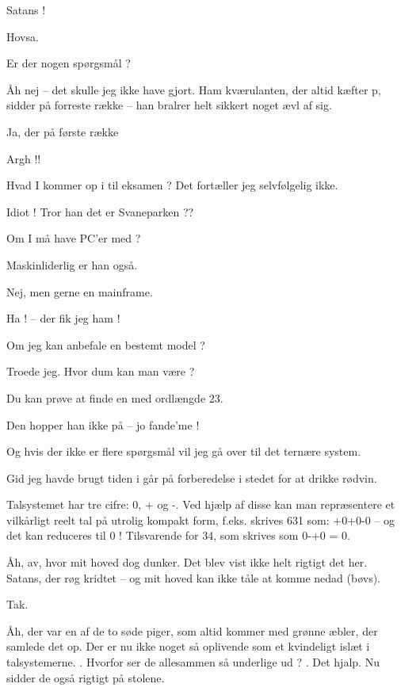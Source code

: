 \documentclass[a4paper,11pt]{article}
\begin{document}
\begin{sketch}
 Satans !

 Hovsa. 

 Er der nogen spørgsmål ?

 Åh nej -- det skulle jeg ikke have gjort. Ham kværulanten, der altid
kæfter p, sidder på forreste række -- han bralrer helt sikkert noget ævl af sig.

 Ja, der på første række

 Argh !!

 Hvad I kommer op i til eksamen ?  Det fortæller jeg selvfølgelig ikke.

 Idiot ! Tror han det er Svaneparken ??

 Om I må have PC'er med ?

 Maskinliderlig er han også.

 Nej, men gerne en mainframe.

 Ha ! -- der fik jeg ham !

 Om jeg kan anbefale en bestemt model ?

 Troede jeg. Hvor dum kan man være ?

 Du kan prøve at finde en med ordlængde 23.

 Den hopper han ikke på -- jo fande'me !

 Og hvis der ikke er flere spørgsmål vil jeg gå over til det ternære
system. 

 Gid jeg havde brugt tiden i går på forberedelse i stedet for at drikke
rødvin.

 Talsystemet har tre cifre: 0, + og -. Ved hjælp af disse kan man
repræsentere et vilkårligt reelt tal på utrolig kompakt form, f.eks. skrives 631
som: +0+0-0 -- og det kan reduceres til 0 ! Tilsvarende for 34, som skrives som
0-+0 = 0.

 Åh, av, hvor mit hoved dog dunker. Det blev vist ikke helt rigtigt det
her. Satans, der røg kridtet -- og mit hoved kan ikke tåle at komme nedad
(bøvs).

 Tak.

 Åh, der var en af de to søde piger, som altid kommer med grønne æbler,
der samlede det op. Der er nu ikke noget så oplivende som et kvindeligt islæt i
talsystemerne. . Hvorfor ser de allesammen så underlige ud ?
. Det hjalp. Nu sidder
de også rigtigt på stolene.


\end{sketch}
\end{document}
